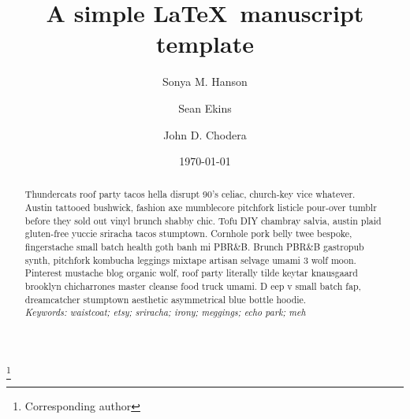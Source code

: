 \documentclass[aps,pre,twocolumn,nofootinbib,superscriptaddress,linenumbers,11point]{revtex4-1}
\begin{document}

\title{A simple \LaTeX\ manuscript template}

\author{Sonya M. Hanson}
\author{Sean Ekins}
\author{John D. Chodera}
 \thanks{Corresponding author}

\date{\today}


\begin{abstract}

Thundercats roof party tacos hella disrupt 90's celiac, church-key vice whatever. 
Austin tattooed bushwick, fashion axe mumblecore pitchfork listicle pour-over tumblr before they sold out vinyl brunch shabby chic. Tofu DIY chambray salvia, austin plaid gluten-free yuccie sriracha tacos stumptown. Cornhole pork belly twee bespoke, fingerstache small batch health goth banh mi PBR\&B. 
Brunch PBR\&B gastropub synth, pitchfork kombucha leggings mixtape artisan selvage umami 3 wolf moon. Pinterest mustache blog organic wolf, roof party literally tilde keytar knausgaard brooklyn chicharrones master cleanse food truck umami. D
eep v small batch fap, dreamcatcher stumptown aesthetic asymmetrical blue bottle hoodie.\\

\emph{Keywords: waistcoat; etsy; sriracha; irony; meggings; echo park; meh}

\end{abstract}

\maketitle

\end{document}

